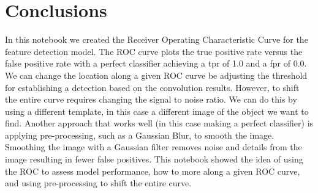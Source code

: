 \documentclass[11pt]{article}
\begin{document}
    \hypertarget{conclusions}{%
\section{Conclusions}\label{conclusions}}

In this notebook we created the Receiver Operating Characteristic Curve
for the feature detection model. The ROC curve plots the true positive
rate versus the false positive rate with a perfect classifier achieving
a tpr of 1.0 and a fpr of 0.0. We can change the location along a given
ROC curve be adjusting the threshold for establishing a detection based
on the convolution results. However, to shift the entire curve requires
changing the signal to noise ratio. We can do this by using a different
template, in this case a different image of the object we want to find.
Another approach that works well (in this case making a perfect
classifier) is applying pre-processing, such as a Gaussian Blur, to
smooth the image. Smoothing the image with a Gaussian filter removes
noise and details from the image resulting in fewer false positives.
This notebook showed the idea of using the ROC to assess model
performance, how to more along a given ROC curve, and using
pre-processing to shift the entire curve.


    
    
    
    
\end{document}
